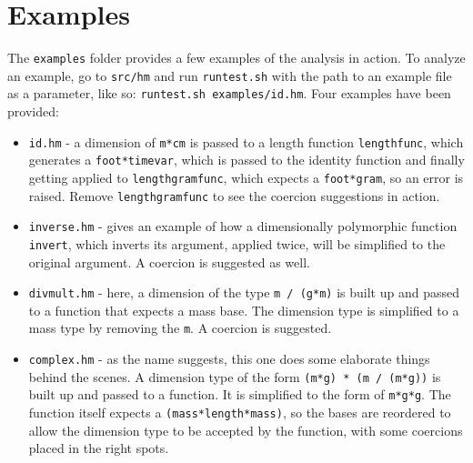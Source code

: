 \documentclass[a4paper,10pt]{article}
\begin{document}
\section{Examples}\label{examples}
The \texttt{examples} folder provides a few examples of the analysis in action. To analyze an example, go to \texttt{src/hm} and run \texttt{runtest.sh} with the path to an example file as a parameter, like so: \texttt{runtest.sh examples/id.hm}.
Four examples have been provided:
\begin{itemize}
	\item \texttt{id.hm} - a dimension of \texttt{m*cm} is passed to a length function  \texttt{lengthfunc}, which generates a  \texttt{foot*timevar}, which is passed to the identity function and finally getting applied to \texttt{lengthgramfunc}, which expects a \texttt{foot*gram}, so an error is raised. Remove \texttt{lengthgramfunc} to see the coercion suggestions in action.
	\item \texttt{inverse.hm} - gives an example of how a dimensionally polymorphic function \texttt{invert}, which inverts its argument, applied twice, will be simplified to the original argument. A coercion is suggested as well.
	\item \texttt{divmult.hm} - here, a dimension of the type \texttt{m / (g*m)} is built up and passed to a function that expects a mass base. The dimension type is simplified to a mass type by removing the \texttt{m}. A coercion is suggested.
	\item \texttt{complex.hm} - as the name suggests, this one does some elaborate things behind the scenes. A dimension type of the form \texttt{(m*g) * (m / (m*g))} is built up and passed to a function. It is simplified to the form of  \texttt{m*g*g}. The function itself expects a \texttt{(mass*length*mass)}, so the bases are reordered to allow the dimension type to be accepted by the function, with some coercions placed in the right spots.
\end{itemize}
\end{document}
